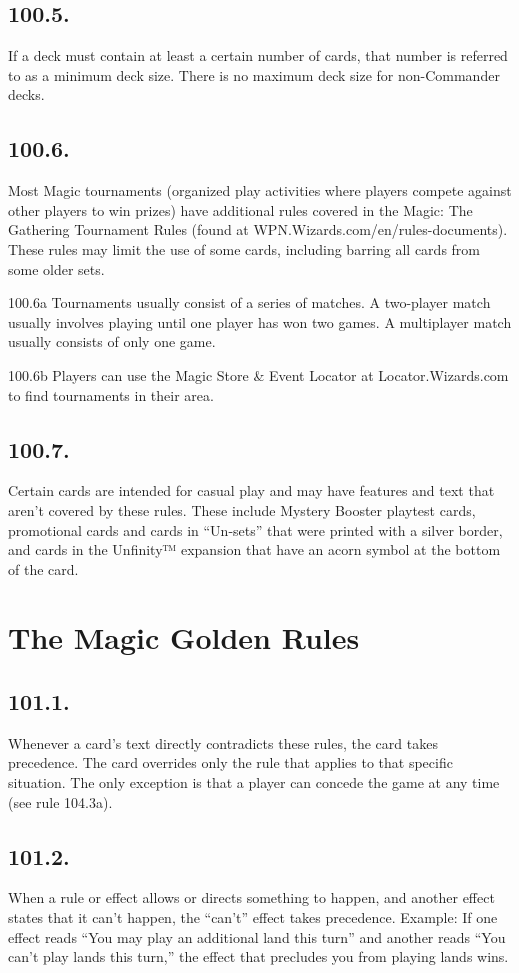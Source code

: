 \subsection*{100.5.}
If a deck must contain at least a certain number of cards, that number is referred to as a minimum deck size. There is no maximum deck size for non-Commander decks.

\subsection*{100.6.}
Most Magic tournaments (organized play activities where players compete against other players to win prizes) have additional rules covered in the Magic: The Gathering Tournament Rules (found at WPN.Wizards.com/en/rules-documents). These rules may limit the use of some cards, including barring all cards from some older sets.

100.6a Tournaments usually consist of a series of matches. A two-player match usually involves playing until one player has won two games. A multiplayer match usually consists of only one game.

100.6b Players can use the Magic Store \& Event Locator at Locator.Wizards.com to find tournaments in their area.

\subsection*{100.7.}
Certain cards are intended for casual play and may have features and text that aren’t covered by these rules. These include Mystery Booster playtest cards, promotional cards and cards in “Un-sets” that were printed with a silver border, and cards in the Unfinity™ expansion that have an acorn symbol at the bottom of the card.

\section{The Magic Golden Rules}
\subsection*{101.1.}
Whenever a card’s text directly contradicts these rules, the card takes precedence. The card overrides only the rule that applies to that specific situation. The only exception is that a player can concede the game at any time (see rule 104.3a).

\subsection*{101.2.}
When a rule or effect allows or directs something to happen, and another effect states that it can’t happen, the “can’t” effect takes precedence.
Example: If one effect reads “You may play an additional land this turn” and another reads “You can’t play lands this turn,” the effect that precludes you from playing lands wins.

